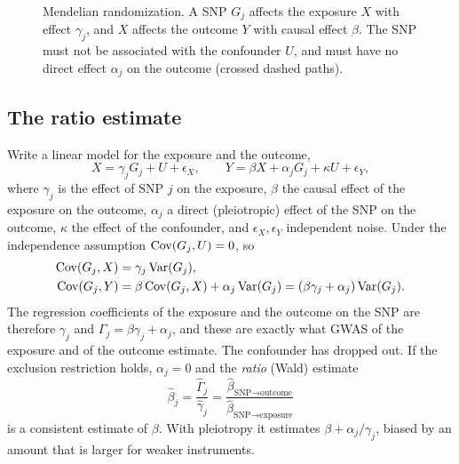 \begin{figure}[!htbp]
  \centering
  \caption{Mendelian randomization. A SNP $G_j$ affects the exposure $X$ with effect $\gamma_j$, and $X$ affects the outcome $Y$ with causal effect $\beta$. The SNP must not be associated with the confounder $U$, and must have no direct effect $\alpha_j$ on the outcome (crossed dashed paths).}
  \label{fig:mr_dag}
\end{figure}

\subsection{The ratio estimate}

Write a linear model for the exposure and the outcome,
\begin{equation}
  X = \gamma_jG_j + U + \epsilon_X, \qquad Y = \beta X + \alpha_jG_j + \kappa U + \epsilon_Y,
\end{equation}
where $\gamma_j$ is the effect of SNP $j$ on the exposure, $\beta$ the causal effect of the exposure on the outcome, $\alpha_j$ a direct (pleiotropic) effect of the SNP on the outcome, $\kappa$ the effect of the confounder, and $\epsilon_X,\epsilon_Y$ independent noise. Under the independence assumption $\operatorname{Cov}(G_j,U)=0$, so
\begin{align}
  \operatorname{Cov}(G_j,X) &= \gamma_j\operatorname{Var}(G_j), \\
  \operatorname{Cov}(G_j,Y) &= \beta\operatorname{Cov}(G_j,X) + \alpha_j\operatorname{Var}(G_j) = (\beta\gamma_j+\alpha_j)\operatorname{Var}(G_j).
\end{align}
The regression coefficients of the exposure and the outcome on the SNP are therefore $\gamma_j$ and $\Gamma_j=\beta\gamma_j+\alpha_j$, and these are exactly what GWAS of the exposure and of the outcome estimate. The confounder has dropped out. If the exclusion restriction holds, $\alpha_j=0$ and the \emph{ratio} (Wald) estimate
\begin{equation}
  \hat\beta_j = \frac{\hat\Gamma_j}{\hat\gamma_j} = \frac{\hat\beta_{\text{SNP}\to\text{outcome}}}{\hat\beta_{\text{SNP}\to\text{exposure}}}
\end{equation}
is a consistent estimate of $\beta$. With pleiotropy it estimates $\beta+\alpha_j/\gamma_j$, biased by an amount that is larger for weaker instruments.

